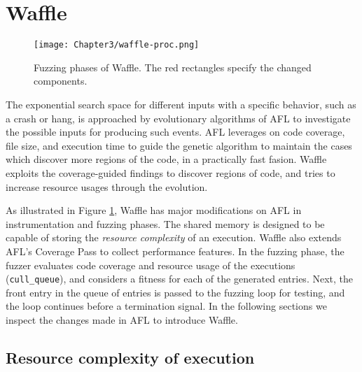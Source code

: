 \section{Waffle}
\label{sec:3-instr}



\begin{figure}[!t]
  \texttt{[image: Chapter3/waffle-proc.png]}
  \centering
  \caption{Fuzzing phases of Waffle. The red rectangles specify the changed components.}
  \label{fig:waffle-phases}
\end{figure}

The exponential search space for different inputs with a specific behavior, such as a crash or hang, is approached by evolutionary algorithms of AFL to investigate the possible inputs for producing such events. AFL leverages on code coverage, file size, and execution time to guide the genetic algorithm to maintain the cases which discover more regions of the code, in a practically fast fasion. Waffle exploits the coverage-guided findings to discover regions of code, and tries to increase resource usages through the evolution.


As illustrated in Figure \ref{fig:waffle-phases}, Waffle has major modifications on AFL in instrumentation and fuzzing phases. The shared memory is designed to be capable of storing the \textit{resource complexity} of an execution. Waffle also extends AFL's Coverage Pass to collect performance features. In the fuzzing phase, the fuzzer evaluates code coverage and resource usage of the executions (\texttt{cull\_queue}), and considers a fitness for each of the generated entries. Next, the front entry in the queue of entries is passed to the fuzzing loop for testing, and the loop continues before a termination signal. In the following sections we inspect the changes made in AFL to introduce Waffle.

\subsection{Resource complexity of execution}

